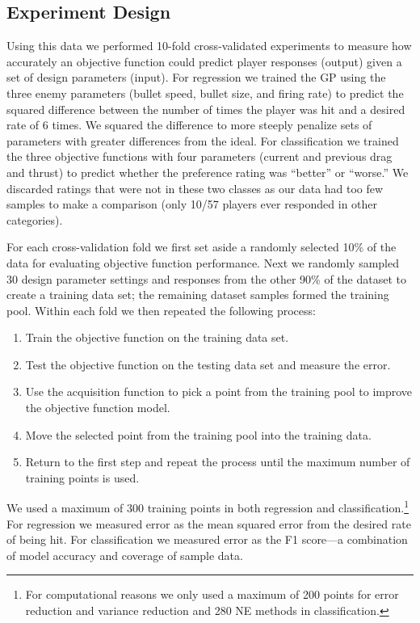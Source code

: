 \documentclass{sig-alternate}
\begin{document}
\subsection{Experiment Design}

Using this data we performed 10-fold cross-validated experiments to measure how accurately an objective function could predict player responses (output) given a set of design parameters (input).
For regression we trained the GP using the three enemy parameters (bullet speed, bullet size, and firing rate) to predict the squared difference between the number of times the player was hit and a desired rate of 6 times.
We squared the difference to more steeply penalize sets of parameters with greater differences from the ideal.
For classification we trained the three objective functions with four parameters (current and previous drag and thrust) to predict whether the preference rating was ``better'' or ``worse.''
We discarded ratings that were not in these two classes as our data had too few samples to make a comparison (only 10/57 players ever responded in other categories).


For each cross-validation fold we first set aside a randomly selected 10\% of the data for evaluating objective function performance.
Next we randomly sampled 30 design parameter settings and responses from the other 90\% of the dataset to create a training data set; the remaining dataset samples formed the training pool.
Within each fold we then repeated the following process:
\begin{enumerate}
\item Train the objective function on the training data set.
\item Test the objective function on the testing data set and measure the error.
\item Use the acquisition function to pick a point from the training pool to improve the objective function model.
\item Move the selected point from the training pool into the training data.
\item Return to the first step and repeat the process until the maximum number of training points is used.
\end{enumerate}
\noindent We used a maximum of 300 training points in both regression and classification.\footnote{For computational reasons we only used a maximum of 200 points for error reduction and variance reduction and 280 NE methods in classification.}
For regression we measured error as the mean squared error from the desired rate of being hit.
For classification we measured error as the F1 score---a combination of model accuracy and coverage of sample data.
\end{document}

